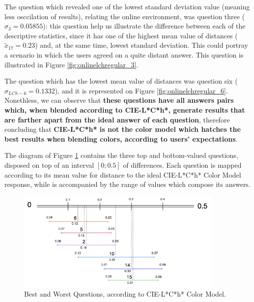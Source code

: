 %
The question which revealed one of the lowest standard deviation value (meaning less osccilation of results), relating the online environment, was question three ($\sigma_{3} = 0.05855$): this question help us
illustrate the difference between each of the descriptive statistics, since it has one of the highest mean value of distances ($\tilde{x}_{17} = 0.23$) and, at the same time, lowest standard deviation. This could
portray a scenario in which the users agreed on a quite distant answer. This question is illustrated in Figure \ref{fig:onlinelchregular_3}. \par
%
The question which has the lowest mean value of distances was question six ($\sigma_{LCh-6} = 0.1332$), and it is represented on Figure \ref{fig:onlinelchregular_6}. Nonethless, we can observe that \textbf{these
questions have all answers pairs which, when blended according to CIE-L*C*h*, generate results that are farther apart from the ideal answer of each question}, therefore concluding that \textbf{CIE-L*C*h* is not
the color model which hatches the best results when blending colors, according to users' expectations}. \par
%
The diagram of Figure \ref{fig:lch_analysis} contains the three top and bottom-valued questions, disposed on top of an interval $[0 ; 0.5]$ of differences. Each question is mapped according to its mean value for
distance to the ideal CIE-L*C*h* Color Model response, while is accompanied by the range of values which compose its answers. \par
%
\begin{figure}[!htbp]
  \centering
  \includegraphics[width=0.9\textwidth]{images/results/lch_questions_analysis.png}
  \caption[Best and Worst Questions, according to CIE-L*C*h* Color Model.]{Best and Worst Questions, according to CIE-L*C*h* Color Model.}
  \label{fig:lch_analysis}
\end{figure}
%
%
